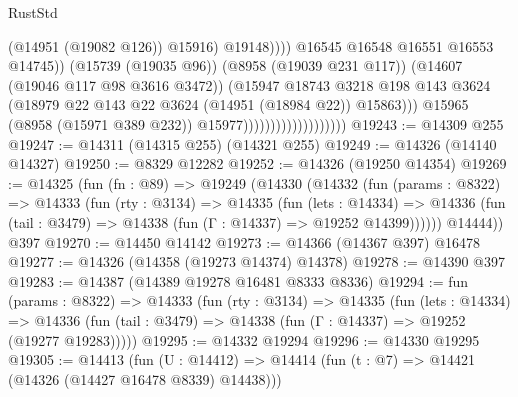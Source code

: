\begin{lexlean}{RustStd}
\begin{coremodule}
                                                          (@14951 (@19082 @126))
                                                          @15916)
                                                        @19148))))
                                                @16545
                                                @16548
                                                @16551
                                                @16553
                                                @14745))
                                            (@15739 (@19035 @96))
                                            (@8958 (@19039 @231 @117))
                                            (@14607 (@19046 @117 @98 @3616 @3472))
                                            (@15947
                                              @18743
                                              @3218
                                              @198
                                              @143
                                              @3624
                                              (@18979
                                                @22
                                                @143
                                                @22
                                                @3624
                                                (@14951 (@18984 @22))
                                                @15863)))
                                          @15965
                                          (@8958 (@15971 @389 @232))
                                          @15977)))))))))))))))))))
@19243 := @14309 @255
@19247 := @14311 (@14315 @255) (@14321 @255)
@19249 := @14326 (@14140 @14327)
@19250 := @8329 @12282
@19252 := @14326 (@19250 @14354)
@19269 := @14325
    (fun (fn : @89) =>
    @19249
      (@14330
        (@14332
          (fun (params : @8322) =>
          @14333
            (fun (rty : @3134) =>
            @14335
              (fun (lets : @14334) =>
              @14336 (fun (tail : @3479) => @14338 (fun (Γ : @14337) => @19252 @14399))))))
        @14444))
    @397
@19270 := @14450 @14142
@19273 := @14366 (@14367 @397) @16478
@19277 := @14326 (@14358 (@19273 @14374) @14378)
@19278 := @14390 @397
@19283 := @14387 (@14389 @19278 @16481 @8333 @8336)
@19294 := fun (params : @8322) =>
  @14333
    (fun (rty : @3134) =>
    @14335
      (fun (lets : @14334) =>
      @14336 (fun (tail : @3479) => @14338 (fun (Γ : @14337) => @19252 (@19277 @19283)))))
@19295 := @14332 @19294
@19296 := @14330 @19295
@19305 := @14413
    (fun (U : @14412) => @14414 (fun (t : @7) => @14421 (@14326 (@14427 @16478 @8339) @14438)))

\end{coremodule}
\end{lexlean}
